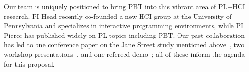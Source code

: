 
Our team is uniquely positioned to bring PBT into this vibrant area
of PL+HCI research.  PI Head recently
co-founded a new HCI group at
the University of Pennsylvania and specializes in interactive
programming environments, while PI Pierce has published widely on PL
topics including PBT.  Our past collaboration has led to
one conference paper on the Jane Street study mentioned above~\cite{ref:goldstein2024property},
two workshop
presentations~\cite{goldstein_problems_2022,shi_towards_2023}, and one
refereed demo~\cite{ref:goldstein2023tyche}; all of these inform the
agenda for this proposal.


